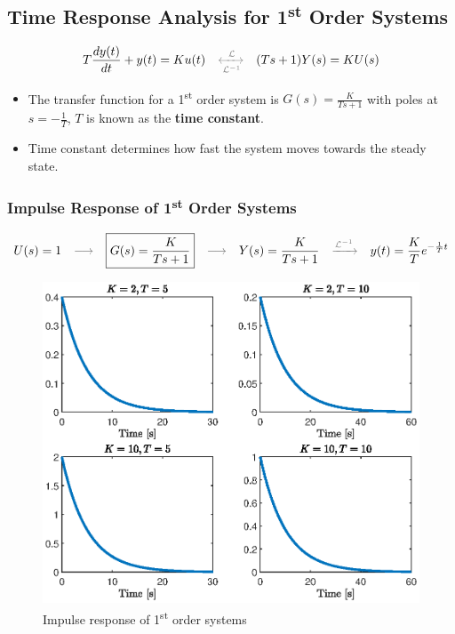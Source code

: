 \subsection{Time Response Analysis for 1\textsuperscript{st} Order Systems}
\[
T\frac{dy(t)}{dt}+y(t)=Ku(t) 
\quad {\color{gray}\xleftrightarrow[\mathcal{L}^{-1}]{\mathcal{L}}} \quad  
(Ts+1)Y(s)=KU(s)
\]
\begin{itemize}
    \item The transfer function for a 1\textsuperscript{st} order system is $G(s)=\frac{K}{Ts+1}$ with poles at $s=-\frac{1}{T}$,  $T$ is known as the \textbf{time constant}. 
    \item Time constant determines how fast the system moves towards the steady state.
\end{itemize}

\subsubsection{Impulse Response of 1\textsuperscript{st} Order Systems}
\[
U(s)=1 
\quad {\color{gray}\longrightarrow} \quad 
\boxed{G(s)=\frac{K}{Ts+1}}
\quad {\color{gray}\longrightarrow} \quad 
Y(s)= \frac{K}{Ts+1} 
\quad {\color{gray}\xrightarrow[]{\mathcal{L}^{-1}}} \quad 
y(t) = \frac{K}{T}e^{-\frac{1}{T}t}
\]

\begin{figure}[H] 
    \centering 
    \includegraphics[width=.8\textwidth]{images/impulse_response.eps}
    \caption{Impulse response of 1\textsuperscript{st} order systems}
\end{figure}

